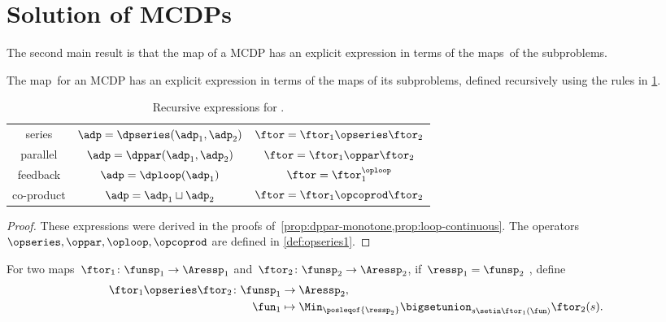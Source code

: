 
\section{Solution of MCDPs}
\label{sec:Solution-of-Monotone}

The second main result is that the map \ftor of a MCDP has an explicit expression in terms of the maps~\ftor of the subproblems.

\begin{theorem}
    \label{thm:CDP-solvig}
    The map~\ftor for an MCDP has an explicit expression in terms of the maps \ftor of its subproblems, defined recursively using the rules in \cref{tab:correspondence}.
\end{theorem}

\begin{table}[h]
    \caption{Recursive expressions for \ftor.}
    \label{tab:correspondence}
    \centering{}\setlength\extrarowheight{5pt}\normalsize
    \begin{tabular}{ccc}
        series     & $\adp=\dpseries(\adp_{1},\adp_{2})$ & $\ftor=\ftor_{1}\opseries\ftor_{2}$\tabularnewline
        parallel   & $\adp=\dppar(\adp_{1},\adp_{2})$    & $\ftor=\ftor_{1}\oppar\ftor_{2}$\tabularnewline
        feedback   & $\adp=\dploop(\adp_{1})$            & $\ftor=\ftor_{1}^{\oploop}$\tabularnewline
        co-product & $\adp=\adp_{1}\sqcup\adp_{2}$       & $\ftor=\ftor_{1}\opcoprod\ftor_{2}$\tabularnewline
    \end{tabular}
\end{table}

\begin{proof}
    These expressions were derived in the proofs of~\cref{prop:dppar-monotone,prop:loop-continuous}.
    The operators $\opseries,\oppar,\oploop,\opcoprod$ are defined in \cref{def:opseries1}.
\end{proof}
\begin{definition}
    \label{def:opseries1}
    For two maps~$\ftor_{1}\colon\funsp_{1}\rightarrow\Aressp_{1}$
    and~$\ftor_{2}\colon\funsp_{2}\rightarrow\Aressp_{2}$, if~$\ressp_{1}=\funsp_{2}$
    , define
    \begin{align*}
        {\displaystyle \ftor_{1}\opseries\ftor_{2}\colon\funsp_{1}}
                 & \rightarrow\Aressp_{2}, \\
        \fun_{1} & \mapsto\Min_{\posleqof{\ressp_{2}}}\bigsetunion_{s\setin\ftor_{1}(\fun)}\ftor_{2}(s).
    \end{align*}
\end{definition}

